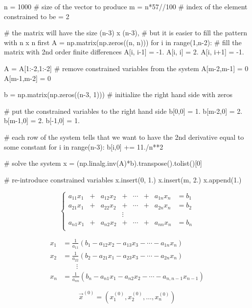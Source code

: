 \documentclass[notitlepage]{report}
\begin{document}
\begin{python}
n = 1000      # size of the vector to produce
m = n*57//100 # index of the element constrained to be = 2

# the matrix will have the size (n-3) x (n-3),
# but it is easier to fill the pattern with n x n first
A = np.matrix(np.zeros((n, n)))
for i in range(1,n-2): # fill the matrix with 2nd order finite differences
    A[i, i-1] = -1.
    A[i, i]   =  2.
    A[i, i+1] = -1.

A = A[1:-2,1:-2] # remove constrained variables from the system
A[m-2,m-1] = 0
A[m-1,m-2] = 0

b = np.matrix(np.zeros((n-3, 1))) # initialize the right hand side with zeros

# put the constrained variables to the right hand side
b[0,0]   = 1.
b[m-2,0] = 2.
b[m-1,0] = 2.
b[-1,0]  = 1.

# each row of the system tells that we want to have the 2nd derivative equal to some constant
for i in range(n-3):
    b[i,0] += 11./n**2

# solve the system
x = (np.linalg.inv(A)*b).transpose().tolist()[0]

# re-introduce constrained variables
x.insert(0, 1.)
x.insert(m, 2.)
x.append(1.)
\end{python}
\fi

$$
\left\{
\begin{array}{cccccccc}
a_{11}x_1 & + &  a_{12}x_2  &+      & \cdots & + & a_{1n}x_n &= b_1\\
a_{21}x_1 & + &  a_{22}x_2  &+      & \cdots & + & a_{2n}x_n &= b_2\\
          &   &             &\vdots &        &   &           &     \\
a_{n1}x_1 & + &  a_{n2}x_2  &+      & \cdots & + & a_{nn}x_n &= b_n\\
\end{array}
\right.
$$

\begin{align*}
x_1 &= \frac{1}{a_{11}}(b_1 - a_{12}x_2 - a_{13}x_3 - \cdots - a_{1n}x_n)\\
x_2 &= \frac{1}{a_{22}}(b_2 - a_{21}x_1 - a_{23}x_3 - \cdots - a_{2n}x_n)\\
    & \qquad \vdots \\
x_n &= \frac{1}{a_{nn}}(b_n - a_{n1}x_1 - a_{n2}x_2 - \cdots - a_{n,n-1}x_{n-1})
\end{align*}

$$\vec{x}^{(0)}=\left(x_1^{(0)}, x_2^{(0)}, \dots, x_n^{(0)}\right)$$
\end{document}
